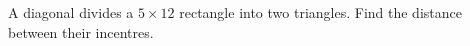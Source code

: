 A diagonal divides a $ 5\times12 $ rectangle into two triangles. Find the distance between their incentres.
